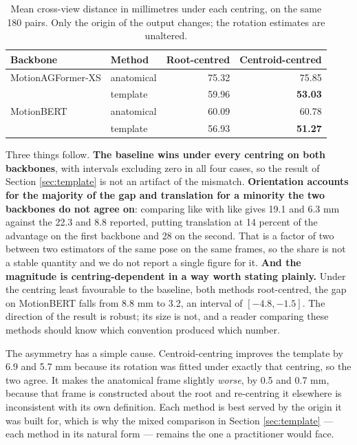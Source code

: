 \begin{table}[htbp]
\centering
\caption[Orientation or translation]{Mean cross-view distance in millimetres under each centring, on the same 180 pairs. Only the origin of the output changes; the rotation estimates are unaltered.}
\label{tab:translation}
{\fontsize{10}{12}\selectfont
\begin{tabular}{llrr}
\hline
\textbf{Backbone} & \textbf{Method} & \textbf{Root-centred} & \textbf{Centroid-centred} \\
\hline
MotionAGFormer-XS & anatomical & 75.32 & 75.85 \\
                  & template   & 59.96 & \textbf{53.03} \\
\hline
MotionBERT        & anatomical & 60.09 & 60.78 \\
                  & template   & 56.93 & \textbf{51.27} \\
\hline
\end{tabular}}
\end{table}

Three things follow. \textbf{The baseline wins under every centring on both backbones}, with intervals excluding zero in all four cases, so the result of Section \ref{sec:template} is not an artifact of the mismatch. \textbf{Orientation accounts for the majority of the gap and translation for a minority the two backbones do not agree on}: comparing like with like gives 19.1 and 6.3 mm against the 22.3 and 8.8 reported, putting translation at 14 percent of the advantage on the first backbone and 28 on the second. That is a factor of two between two estimators of the same pose on the same frames, so the share is not a stable quantity and we do not report a single figure for it. \textbf{And the magnitude is centring-dependent in a way worth stating plainly.} Under the centring least favourable to the baseline, both methods root-centred, the gap on MotionBERT falls from 8.8 mm to 3.2, an interval of $[-4.8, -1.5]$. The direction of the result is robust; its size is not, and a reader comparing these methods should know which convention produced which number.

The asymmetry has a simple cause. Centroid-centring improves the template by 6.9 and 5.7 mm because its rotation was fitted under exactly that centring, so the two agree. It makes the anatomical frame slightly \emph{worse}, by 0.5 and 0.7 mm, because that frame is constructed about the root and re-centring it elsewhere is inconsistent with its own definition. Each method is best served by the origin it was built for, which is why the mixed comparison in Section \ref{sec:template} --- each method in its natural form --- remains the one a practitioner would face.

